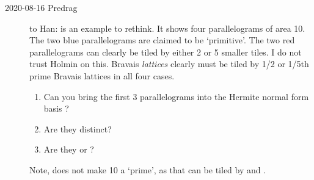 \begin{description}
	\item[2020-08-16 Predrag] to Han:
 is an example to rethink. It shows four
parallelograms of area 10. The two blue parallelograms are claimed to be
`primitive'. The two red parallelograms can clearly be tiled by either 2
or 5 smaller tiles. I do not trust Holmin on this. Bravais
\emph{lattices} clearly must be tiled by 1/2 or 1/5th prime Bravais
{lattices} in all four cases.
\begin{enumerate}
  \item Can you bring the first 3 parallelograms into
the Hermite normal form basis ?
  \item Are they distinct?
  \item Are they  or ?
\end{enumerate}
Note,  does not make 10 a `prime', as that
can be tiled by  and .


\end{description}
